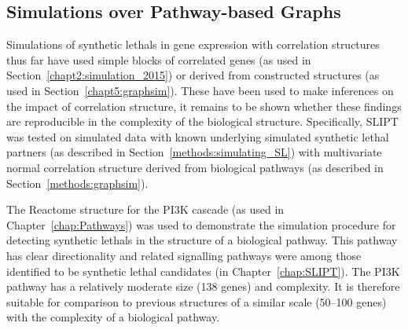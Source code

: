 

\subsection{Simulations over Pathway-based Graphs}

\FloatBarrier

Simulations of \glspl{synthetic lethal} in \gls{gene expression} with correlation structures thus far have used simple blocks of correlated genes (as used in Section~\ref{chapt2:simulation_2015}) or derived from constructed  structures (as used in Section~\ref{chapt5:graphsim}). These have been used to make inferences on the impact of correlation structure, it remains to be shown whether these findings are reproducible in the complexity of the biological  structure. Specifically, \gls{SLIPT} was tested on simulated data with known underlying simulated \gls{synthetic lethal} partners (as described in Section~\ref{methods:simulating_SL}) with multivariate normal correlation structure derived from biological pathways (as described in Section~\ref{methods:graphsim}).

The Reactome  structure for the \gls{PI3K} cascade (as used in Chapter~\ref{chap:Pathways}) was used to demonstrate the simulation procedure for detecting \glspl{synthetic lethal} in the  structure of a biological pathway. This pathway has clear directionality and related signalling pathways were among those identified to be \gls{synthetic lethal} candidates (in Chapter~\ref{chap:SLIPT}). The \gls{PI3K} pathway has a relatively moderate size (138 genes) and complexity. It is therefore suitable for comparison to previous  structures of a similar scale (50--100 genes) with the complexity of a biological pathway.

